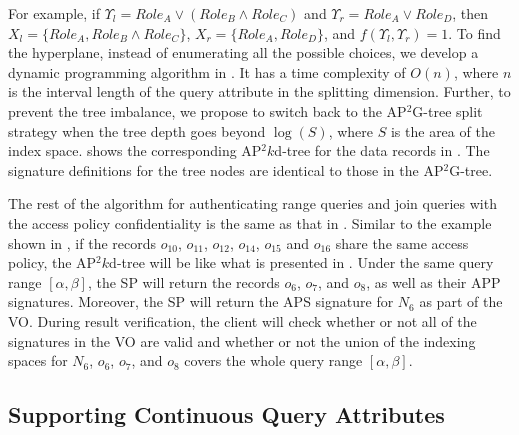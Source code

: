 For example, if $\Upsilon_l = {Role}_{A} \lor ({Role}_{B} \land {Role}_{C})$ and $\Upsilon_r = {Role}_{A} \lor {Role}_{D}$, then $X_l = \{ {Role}_{A}, {Role}_{B} \land {Role}_{C} \}$, $X_r = \{ {Role}_{A}, {Role}_{D} \}$, and $f(\Upsilon_l, \Upsilon_r) = 1$.
To find the hyperplane, instead of enumerating all the possible choices, we develop a dynamic programming algorithm in .
It has a time complexity of $O(n)$, where $n$ is the interval length of the query attribute in the splitting dimension.
Further, to prevent the tree imbalance, we propose to switch back to the AP$^2$G-tree split strategy when the tree depth goes beyond $\log(S)$, where $S$ is the area of the index space.
 shows the corresponding AP$^2k$d-tree for the data records in . The signature definitions for the tree nodes are identical to those in the AP$^2$G-tree.

The rest of the algorithm for authenticating range queries and join queries with the access policy confidentiality is the same as that in .
Similar to the example shown in , if the records $o_{10}$, $o_{11}$, $o_{12}$, $o_{14}$, $o_{15}$ and $o_{16}$ share the same access policy, the AP$^2k$d-tree will be like what is presented in . Under the same query range $[\alpha, \beta]$, the SP will return the records $o_6$, $o_7$, and $o_8$, as well as their APP signatures. Moreover, the SP will return the APS signature for $N_6$  as part of the VO\@. During result verification, the client will check whether or not all of the signatures in the VO are valid and whether or not the union of the indexing spaces for $N_6$, $o_6$, $o_7$, and $o_8$ covers the whole query range $[\alpha,\beta]$.

\subsection{Supporting Continuous Query Attributes}\label{sec:access-control:continuous-attribute}

